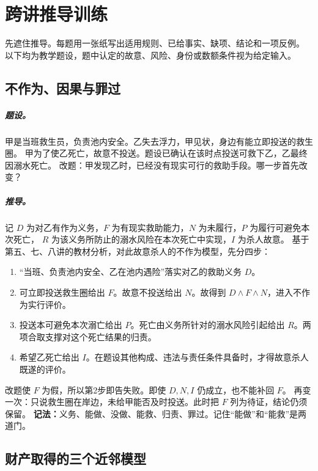 \chapter{跨讲推导训练}

先遮住推导。每题用一张纸写出适用规则、已给事实、缺项、结论和一项反例。
以下均为教学题设，题中认定的故意、风险、身份或数额条件视为给定输入。

\section{不作为、因果与罪过}

\paragraph{题设。}
甲是当班救生员，负责池内安全。乙失去浮力，甲见状，身边有能立即投送的救生圈。
甲为了使乙死亡，故意不投送。题设已确认在该时点投送可救下乙，乙最终因溺水死亡。
改题：甲发现乙时，已经没有现实可行的救助手段。哪一步首先改变？

\paragraph{推导。}
记 $D$ 为对乙有作为义务，$F$ 为有现实救助能力，$N$ 为未履行，$P$ 为履行可避免本次死亡，
$R$ 为该义务所防止的溺水风险在本次死亡中实现，$I$ 为杀人故意。
基于第五、七、八讲的教材分析，对此故意杀人的不作为模型，先分四步：
\begin{enumerate}
 \item “当班、负责池内安全、乙在池内遇险”落实对乙的救助义务 $D$。
 \item 可立即投送救生圈给出 $F$。故意不投送给出 $N$。故得到 $D\land F\land N$，进入不作为实行评价。
 \item 投送本可避免本次溺亡给出 $P$。死亡由义务所针对的溺水风险引起给出 $R$。两项合取支撑对这个死亡结果的归责。
 \item 希望乙死亡给出 $I$。在题设其他构成、违法与责任条件具备时，才得故意杀人既遂的评价。
\end{enumerate}
改题使 $F$ 为假，所以第2步即告失败。即使 $D,N,I$ 仍成立，也不能补回 $F$。
再变一次：只说救生圈在岸边，未给甲能否及时投送。此时把 $F$ 列为待证，结论仍须保留。
\textbf{记法：}义务、能做、没做、能救、归责、罪过。记住“能做”和“能救”是两道门。

\section{财产取得的三个近邻模型}

